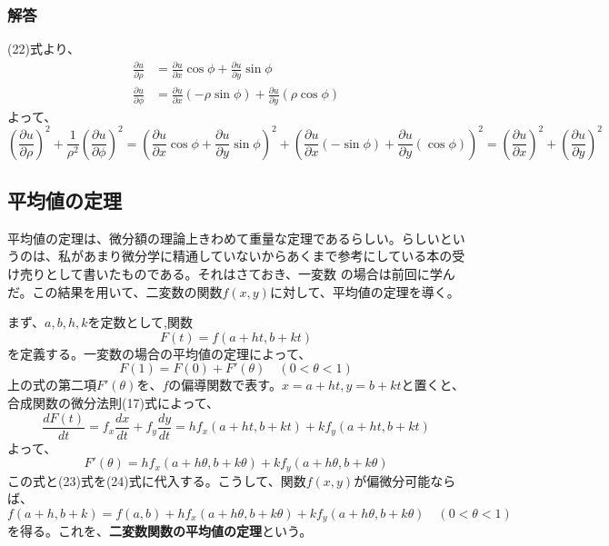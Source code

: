\documentclass[a4j,dvipdfmx]{jsarticle}
\begin{document}
\subsubsection*{解答}
(22)式より、
\begin{align*}
    \frac{\partial u}{\partial \rho}&=\frac{\partial u}{\partial x}\cos\phi+\frac{\partial u}{\partial y}\sin \phi\\
    \frac{\partial u}{\partial \phi}&=\frac{\partial u}{\partial x}(-\rho\sin\phi)+\frac{\partial u}{\partial y}(\rho\cos\phi)
\end{align*}
よって、
\begin{equation*}
    \left(\frac{\partial u}{\partial \rho}\right)^2+\frac{1}{\rho^2}\left(\frac{\partial u}{\partial \phi}\right)^2=\left(\frac{\partial u}{\partial x}\cos\phi+\frac{\partial u}{\partial y}\sin \phi\right)^2+\left(\frac{\partial u}{\partial x}(-\sin\phi)+\frac{\partial u}{\partial y}(\cos\phi)\right)^2
    =\left(\frac{\partial u}{\partial x}\right)^2+\left(\frac{\partial u}{\partial y}\right)^2
\end{equation*}

\subsection{平均値の定理}
平均値の定理は、微分額の理論上きわめて重量な定理であるらしい。らしいというのは、私があまり微分学に精通していないからあくまで参考にしている本の受け売りとして書いたものである。それはさておき、一変数
の場合は前回に学んだ。この結果を用いて、二変数の関数$f(x,y)$に対して、平均値の定理を導く。

まず、$a,b,h,k$を定数として,関数
\begin{equation}
    F(t)=f(a+ht,b+kt)
\end{equation}
を定義する。一変数の場合の平均値の定理によって、
\begin{equation}
    F(1)=F(0)+F'(\theta)\quad(0<\theta<1)
\end{equation}
上の式の第二項$F'(\theta)$を、$f$の偏導関数で表す。$x=a+ht,y=b+kt$と置くと、合成関数の微分法則(17)式によって、
\begin{equation}
    \frac{dF(t)}{dt}=f_x\frac{dx}{dt}+f_y\frac{dy}{dt}=hf_x(a+ht,b+kt)+kf_y(a+ht,b+kt)
\end{equation}
よって、
\begin{equation}
    F'(\theta)=hf_x(a+h\theta,b+k\theta)+kf_y(a+h\theta,b+k\theta)
\end{equation}
この式と(23)式を(24)式に代入する。こうして、関数$f(x,y)$が偏微分可能ならば、
\begin{equation}
    f(a+h,b+k)=f(a,b)+hf_x(a+h\theta,b+k\theta)+kf_y(a+h\theta,b+k\theta)\quad(0<\theta<1)
\end{equation}
を得る。これを、\textbf{二変数関数の平均値の定理}という。
\end{document}
